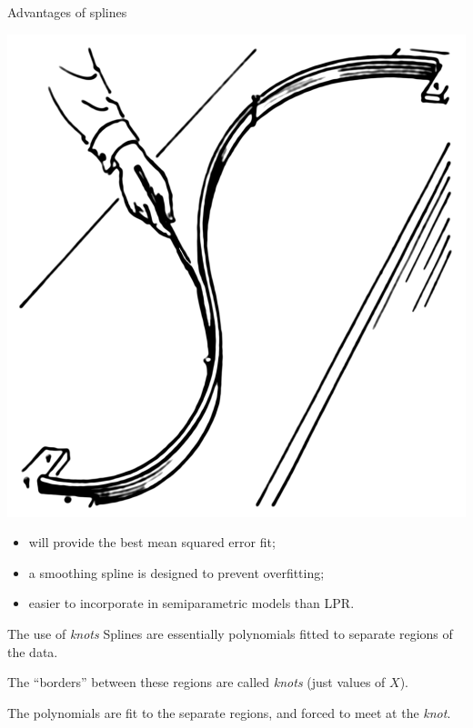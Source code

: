 \documentclass[12pt,english,pdf,xcolor=dvipsnames,aspectratio=169,handout]{beamer}\usepackage[]{graphicx}\usepackage[]{xcolor}
\begin{document}
\begin{frame}{Advantages of splines}

\noindent\begin{minipage}{0.4\textwidth}%
\includegraphics[width=\linewidth]{../04-graphs/Spline-old-school}
\end{minipage}%
\hfill%
\begin{minipage}{0.5\textwidth}
  \begin{itemize}
  \item will provide the best mean squared error fit;
  \item a smoothing spline is designed to prevent overfitting;
  \item easier to incorporate in semiparametric models than LPR.
  \end{itemize}
\end{minipage}

\end{frame}



\begin{frame}{The use of \textit{knots}}
  Splines are essentially polynomials fitted to separate regions of the data.\bigskip

  The ``borders'' between these regions are called \textit{knots} (just values of $X$).\bigskip

  The polynomials are fit to the separate regions, and forced to meet at the \textit{knot}.

\end{frame}
\end{document}
